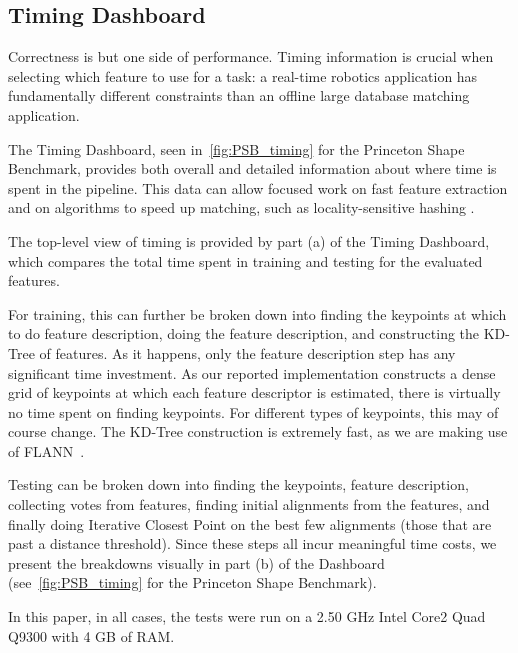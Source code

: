 \subsection{Timing Dashboard}

Correctness is but one side of performance.
Timing information is crucial when selecting which feature to use for a task: a real-time robotics application has fundamentally different constraints than an offline large database matching application.

The Timing Dashboard, seen in~\autoref{fig:PSB_timing} for the Princeton Shape Benchmark, provides both overall and detailed information about where time is spent in the pipeline.
This data can allow focused work on fast feature extraction and on algorithms to speed up matching, such as locality-sensitive hashing \cite{Frome2004}.

The top-level view of timing is provided by part (a) of the Timing Dashboard, which compares the total time spent in training and testing for the evaluated features.

For training, this can further be broken down into finding the keypoints at which to do feature description, doing the feature description, and constructing the KD-Tree of features.
As it happens, only the feature description step has any significant time investment.
As our reported implementation constructs a dense grid of keypoints at which each feature descriptor is estimated, there is virtually no time spent on finding keypoints.
For different types of keypoints, this may of course change. %
The KD-Tree construction is extremely fast, as we are making use of FLANN~\cite{FLANN}.

Testing can be broken down into finding the keypoints, feature description, collecting votes from features, finding initial alignments from the features, and finally doing Iterative Closest Point \cite{BeslMcKay} on the best few alignments (those that are past a distance threshold).
Since these steps all incur meaningful time costs, we present the breakdowns visually in part (b) of the Dashboard (see~\autoref{fig:PSB_timing} for the Princeton Shape Benchmark).

In this paper, in all cases, the tests were run on a 2.50 GHz Intel Core2 Quad Q9300 with 4 GB of RAM.

